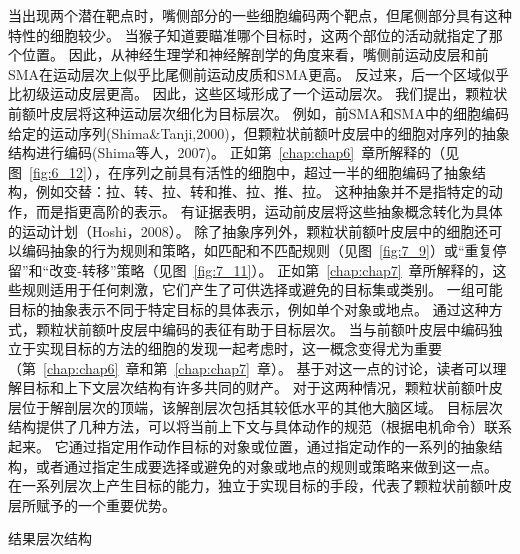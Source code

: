 当出现两个潜在靶点时，嘴侧部分的一些细胞编码两个靶点，但尾侧部分具有这种特性的细胞较少。
当猴子知道要瞄准哪个目标时，这两个部位的活动就指定了那个位置。
因此，从神经生理学和神经解剖学的角度来看，嘴侧前运动皮层和前SMA在运动层次上似乎比尾侧前运动皮质和SMA更高。
反过来，后一个区域似乎比初级运动皮层更高。
因此，这些区域形成了一个运动层次。
我们提出，颗粒状前额叶皮层将这种运动层次细化为目标层次。
例如，前SMA和SMA中的细胞编码给定的运动序列(Shima\&Tanji,2000)，但颗粒状前额叶皮层中的细胞对序列的抽象结构进行编码(Shima等人，2007)。
正如第~\ref{chap:chap6}~章所解释的（见图~\ref{fig:6_12}），在序列之前具有活性的细胞中，超过一半的细胞编码了抽象结构，例如交替：拉、转、拉、转和推、拉、推、拉。
这种抽象并不是指特定的动作，而是指更高阶的表示。
有证据表明，运动前皮层将这些抽象概念转化为具体的运动计划（Hoshi，2008）。
除了抽象序列外，颗粒状前额叶皮层中的细胞还可以编码抽象的行为规则和策略，如匹配和不匹配规则（见图~\ref{fig:7_9}）或“重复停留”和“改变-转移”策略（见图~\ref{fig:7_11}）。
正如第~\ref{chap:chap7}~章所解释的，这些规则适用于任何刺激，它们产生了可供选择或避免的目标集或类别。
一组可能目标的抽象表示不同于特定目标的具体表示，例如单个对象或地点。
通过这种方式，颗粒状前额叶皮层中编码的表征有助于目标层次。
当与前额叶皮层中编码独立于实现目标的方法的细胞的发现一起考虑时，这一概念变得尤为重要（第~\ref{chap:chap6}~章和第~\ref{chap:chap7}~章）。
基于对这一点的讨论，读者可以理解目标和上下文层次结构有许多共同的财产。
对于这两种情况，颗粒状前额叶皮层位于解剖层次的顶端，该解剖层次包括其较低水平的其他大脑区域。
目标层次结构提供了几种方法，可以将当前上下文与具体动作的规范（根据电机命令）联系起来。
它通过指定用作动作目标的对象或位置，通过指定动作的一系列的抽象结构，或者通过指定生成要选择或避免的对象或地点的规则或策略来做到这一点。
在一系列层次上产生目标的能力，独立于实现目标的手段，代表了颗粒状前额叶皮层所赋予的一个重要优势。



结果层次结构

